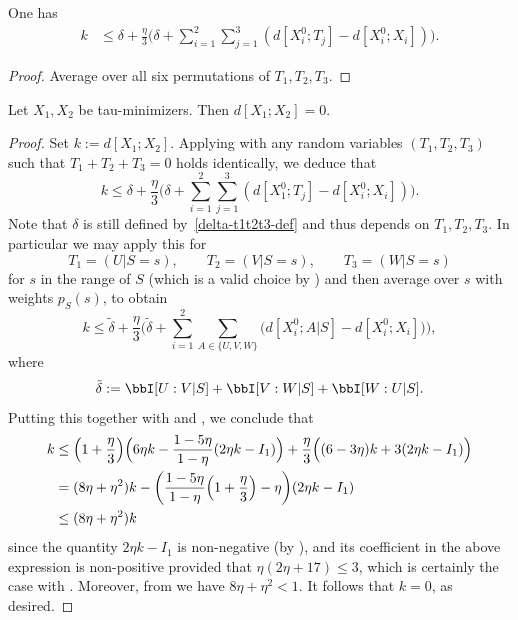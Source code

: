 \begin{lemma}\label{construct-good}
  \leanok
One has
\begin{align*}  k & \leq  \delta + \frac{\eta}{3} \biggl( \delta + \sum_{i=1}^2 \sum_{j = 1}^3 (d[X^0_i;T_j] - d[X^0_i; X_i]) \biggr).
  \end{align*}
\end{lemma}

\begin{proof}
\leanok
Average  over all six permutations of $T_1,T_2,T_3$.
\end{proof}




\begin{theorem}\label{de-prop}
  \leanok
  Let $X_1, X_2$ be tau-minimizers.  Then $d[X_1;X_2] = 0$.
\end{theorem}

\begin{proof}
  \leanok
  Set $k := d[X_1;X_2]$.  Applying  with any random variables $(T_1,T_2,T_3)$ such that $T_1+T_2+T_3=0$ holds identically, we deduce that
\[
  k \leq \delta + \frac{\eta}{3} \biggl( \delta + \sum_{i=1}^2 \sum_{j = 1}^3 (d[X^0_1;T_j] - d[X^0_i;X_i]) \biggr).
\]
Note that $\delta$ is still defined by~\eqref{delta-t1t2t3-def} and thus depends on $T_1,T_2,T_3$.
In particular we may apply this for
\[
  T_1 = (U | S = s),\qquad T_2 = (V | S = s), \qquad T_3 = (W | S = s)
\]
for $s$ in the range of $S$ (which is a valid choice by ) and then average over $s$ with weights $p_S(s)$, to obtain
\[k \leq \tilde \delta + \frac{\eta}{3} \biggl( \tilde \delta + \sum_{i=1}^2 \sum_{A\in\{U,V,W\}} \bigl(  d[X^0_i;A|S] - d[X^0_i;X_i]\bigr) \biggr),\]
where
\[
  \tilde \delta :=  \bbI[U : V | S] + \bbI[V : W | S] + \bbI[W : U | S].
\]
Putting this together with  and , we conclude that
\begin{align*}
  k &\leq \Bigl(1+\frac{\eta}{3}\Bigr)\Bigl(6\eta k-\frac{1-5\eta}{1-\eta}(2\eta k-I_1)\Bigr)+\frac{\eta}{3}\Bigl((6-3\eta)k+3(2\eta k-I_1)\Bigr)\\
  &= (8\eta + \eta^2) k - \biggl( \frac{1 - 5 \eta}{1-\eta}\Bigl(1 + \frac{\eta}{3}\Bigr) -  \eta \biggr)(2 \eta k - I_1)\\
  &\leq (8 \eta + \eta^2) k
 \end{align*}
since the quantity $2 \eta k - I_1$ is non-negative (by ), and its coefficient in the above expression is non-positive provided that $\eta(2\eta + 17) \le 3$, which is certainly the case with .
Moreover, from  we have $8 \eta + \eta^2 < 1$. It follows that $k=0$, as desired.
\end{proof}



